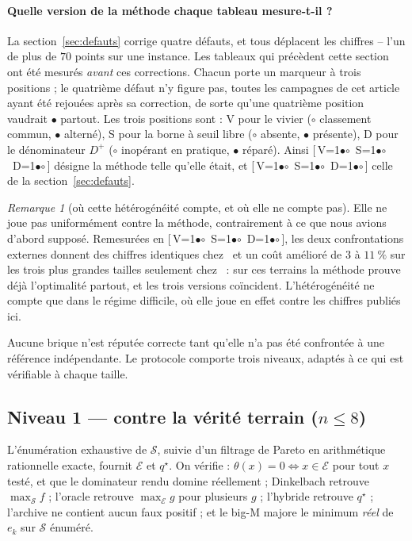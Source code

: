 \documentclass[11pt,a4paper]{article}
\theoremstyle{plain}
\theoremstyle{remark}
\newtheorem{remark}{Remarque}
\newcommand{\Ecal}{\mathcal{E}}
\newcommand{\Scal}{\mathcal{S}}
\newcommand{\qs}{q^{\star}}
\newcommand{\cfgm}[1]{\ifnum#1=1$\bullet$\else$\circ$\fi}
\newcommand{\conf}[3]{%
  \textsf{\footnotesize[\,V\cfgm{#1}\ S\cfgm{#2}\ D\cfgm{#3}\,]}}
\begin{document}
\paragraph{Quelle version de la méthode chaque tableau mesure-t-il ?} La
section~\ref{sec:defauts} corrige quatre défauts, et tous déplacent les
chiffres -- l'un de plus de $70$ points sur une instance. Les tableaux qui
précèdent cette section ont été mesurés \emph{avant} ces corrections. Chacun
porte un marqueur à trois positions ; le quatrième défaut n'y figure pas,
toutes les campagnes de cet article ayant été rejouées après sa correction,
de sorte qu'une quatrième position vaudrait $\bullet$ partout. Les trois
positions sont : \textsf{V} pour le vivier
($\circ$ classement commun, $\bullet$ alterné), \textsf{S} pour la borne à
seuil libre ($\circ$ absente, $\bullet$ présente), \textsf{D} pour le
dénominateur $D^{+}$ ($\circ$ inopérant en pratique, $\bullet$ réparé).
Ainsi \conf{0}{0}{0} désigne la méthode telle qu'elle était, et
\conf{1}{1}{1} celle de la section~\ref{sec:defauts}.

\begin{remark}[où cette hétérogénéité compte, et où elle ne compte pas]
Elle ne joue pas uniformément contre la méthode, contrairement à ce que nous
avions d'abord supposé. Remesurées en \conf{1}{1}{1}, les deux
confrontations externes donnent des chiffres identiques
chez~\cite{zerdani2011} et un coût amélioré de $3$ à $11\ \%$ sur les trois
plus grandes tailles seulement chez~\cite{drici2018} : sur ces terrains la
méthode prouve déjà l'optimalité partout, et les trois versions coïncident.
L'hétérogénéité ne compte que dans le régime difficile, où elle joue en
effet contre les chiffres publiés ici.
\end{remark}


\label{sec:validation}

Aucune brique n'est réputée correcte tant qu'elle n'a pas été confrontée à
une référence indépendante. Le protocole comporte trois niveaux, adaptés à ce
qui est vérifiable à chaque taille.

\subsection{Niveau 1 --- contre la vérité terrain ($n\le 8$)}

L'énumération exhaustive de $\Scal$, suivie d'un filtrage de Pareto en
arithmétique rationnelle exacte, fournit $\Ecal$ et $\qs$. On vérifie :
$\theta(x)=0\iff x\in\Ecal$ pour tout $x$ testé, et que le dominateur rendu
domine réellement ; Dinkelbach retrouve $\max_{\Scal}f$ ; l'oracle retrouve
$\max_{\Ecal}g$ pour plusieurs $g$ ; l'hybride retrouve $\qs$ ; l'archive ne
contient aucun faux positif ; et le big-M majore le minimum \emph{réel} de
$e_k$ sur $\Scal$ énuméré.
\end{document}
